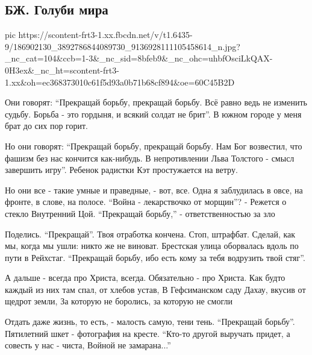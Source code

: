  
 
 
 
 

\subsection{БЖ. Голуби мира}

\ifcmt
  pic https://scontent-frt3-1.xx.fbcdn.net/v/t1.6435-9/186902130_3892786844089730_9136928111105458614_n.jpg?_nc_cat=104&ccb=1-3&_nc_sid=8bfeb9&_nc_ohc=uhbfOsciLkQAX-0H3ex&_nc_ht=scontent-frt3-1.xx&oh=ec368373010c61f5d93a0b71b68cf894&oe=60C45B2D
\fi

Они говорят: \enquote{Прекращай борьбу, прекращай борьбу.
Всё равно ведь не изменить судьбу.
Борьба - это гордыня, и всякий солдат не брит}.
В южном городе у меня брат до сих пор горит.

Но они говорят: \enquote{Прекращай борьбу, прекращай борьбу.
Нам Бог возвестил, что фашизм без нас кончится как-нибудь.
В непротивлении Льва Толстого - смысл завершить игру}.
Ребенок радистки Кэт простужается на ветру.

Но они все - такие умные и праведные, - вот, все.
Одна я заблудилась в овсе, на фронте, в слове, на полосе.
\enquote{Война - лекарствочко от морщин}? - Режется о стекло
Внутренний Цой. \enquote{Прекращай борьбу,} -  ответственностью за зло

Поделись. \enquote{Прекращай}. Твоя отработка кончена. Стоп, штрафбат.
Сделай, как мы, когда мы ушли: никто же не виноват.
Брестская улица оборвалась вдоль по пути в Рейхстаг.
\enquote{Прекращай борьбу, ибо есть кому за тебя водрузить твой стяг}.

А дальше - всегда про Христа, всегда. Обязательно - про Христа.
Как будто каждый из них там спал, от хлебов устав,
В Гефсиманском саду Дахау, вкусив от щедрот земли,
За которую не боролись, за которую не смогли

Отдать даже жизнь, то есть, - малость самую, тени тень.
\enquote{Прекращай борьбу}. Пятилетний шкет - фотография на кресте.
\enquote{Кто-то другой выручать придет, а совесть у нас - чиста,
Войной не замарана...}

